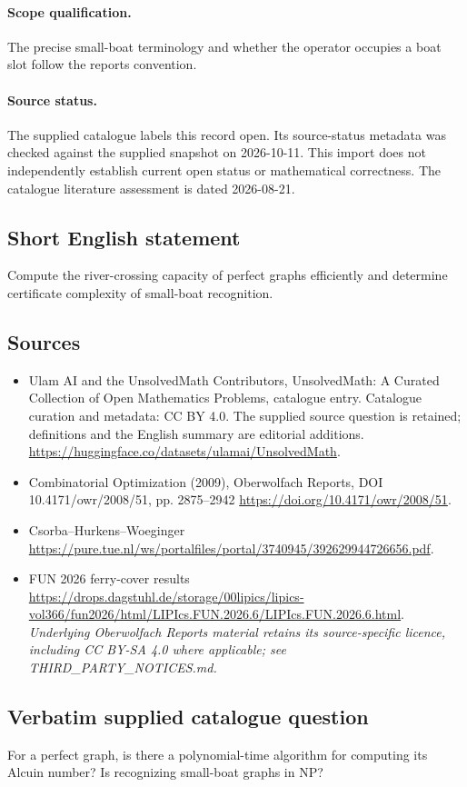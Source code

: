 \documentclass[11pt]{article}
\begin{document}
\paragraph{Scope qualification.}
The precise small-boat terminology and whether the operator occupies a boat slot follow the report\textquotesingle s convention.
\paragraph{Source status.}
The supplied catalogue labels this record open. Its source-status metadata was checked against the supplied snapshot on 2026-10-11. This import does not independently establish current open status or mathematical correctness. The catalogue literature assessment is dated 2026-08-21.
\subsection{Short English statement}
Compute the river-crossing capacity of perfect graphs efficiently and determine certificate complexity of small-boat recognition.
\subsection{Sources}
\begin{itemize}
\item[S1] Ulam AI and the UnsolvedMath Contributors, UnsolvedMath: A Curated Collection of Open Mathematics Problems, catalogue entry. Catalogue curation and metadata: CC BY 4.0. The supplied source question is retained; definitions and the English summary are editorial additions.
\url{https://huggingface.co/datasets/ulamai/UnsolvedMath}.
\item[S2] Combinatorial Optimization (2009), Oberwolfach Reports, DOI 10.4171/owr/2008/51, pp. 2875--2942
\url{https://doi.org/10.4171/owr/2008/51}.
\item[S3] Csorba--Hurkens--Woeginger
\url{https://pure.tue.nl/ws/portalfiles/portal/3740945/392629944726656.pdf}.
\item[S4] FUN 2026 ferry-cover results
\url{https://drops.dagstuhl.de/storage/00lipics/lipics-vol366/fun2026/html/LIPIcs.FUN.2026.6/LIPIcs.FUN.2026.6.html}.
\textit{Underlying Oberwolfach Reports material retains its source-specific licence, including CC BY-SA 4.0 where applicable; see THIRD\_PARTY\_NOTICES.md.}
\end{itemize}
\subsection{Verbatim supplied catalogue question}
For a perfect graph, is there a polynomial-time algorithm for computing its Alcuin number? Is recognizing small-boat graphs in NP?
\end{document}
